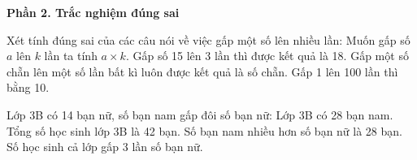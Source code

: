 \textbf{Phần 2. Trắc nghiệm đúng sai}

\begin{ex} %
Xét tính đúng sai của các câu nói về việc gấp một số lên nhiều lần:
\choiceTF
{\True Muốn gấp số $a$ lên $k$ lần ta tính $a \times k$.}
{Gấp số 15 lên 3 lần thì được kết quả là 18.}
{\True Gấp một số chẵn lên một số lần bất kì luôn được kết quả là số chẵn.}
{Gấp 1 lên 100 lần thì bằng 10.}
\end{ex}

\begin{ex} %
Lớp 3B có 14 bạn nữ, số bạn nam gấp đôi số bạn nữ:
\choiceTF
{\True Lớp 3B có 28 bạn nam.}
{\True Tổng số học sinh lớp 3B là 42 bạn.}
{Số bạn nam nhiều hơn số bạn nữ là 28 bạn.}
{\True Số học sinh cả lớp gấp 3 lần số bạn nữ.}
\end{ex}

